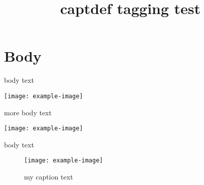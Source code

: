 \documentclass{article}
\title{captdef tagging test}
\begin{document}
\listoffigures

\section{Body}
body text
\begin{center}
\texttt{[image: example-image]}
\end{center}
more body text
\begin{center}
\texttt{[image: example-image]}
\end{center}

body text
\begin{figure}
\centering
\texttt{[image: example-image]}
\caption[short caption text]{my caption text}
\end{figure}
\end{document}
